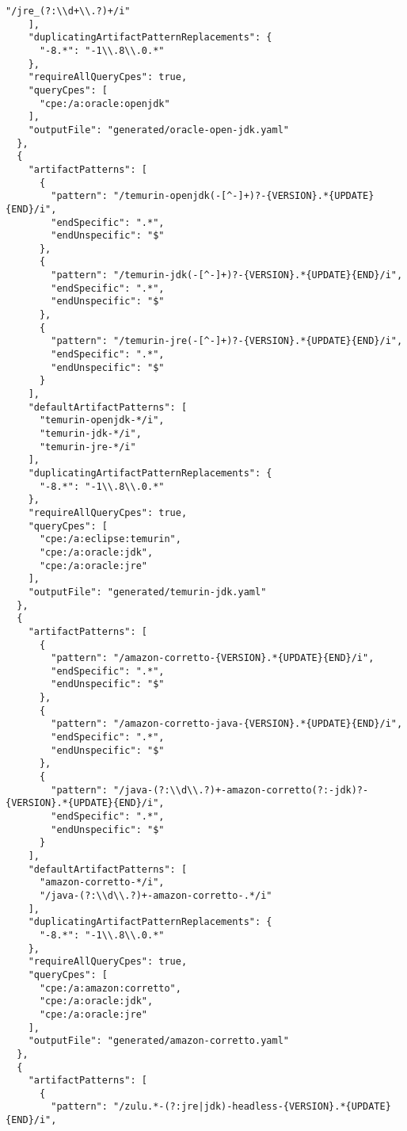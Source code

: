 \begin{lstlisting}[style=json,caption={Korrelationsgeneratordatei im Generatorformat für JRE/JDK},label={lst:correlation-generator-format-cpe-jre-jdk},basicstyle=\ttfamily\scriptsize]
      "/jre_(?:\\d+\\.?)+/i"
    ],
    "duplicatingArtifactPatternReplacements": {
      "-8.*": "-1\\.8\\.0.*"
    },
    "requireAllQueryCpes": true,
    "queryCpes": [
      "cpe:/a:oracle:openjdk"
    ],
    "outputFile": "generated/oracle-open-jdk.yaml"
  },
  {
    "artifactPatterns": [
      {
        "pattern": "/temurin-openjdk(-[^-]+)?-{VERSION}.*{UPDATE}{END}/i",
        "endSpecific": ".*",
        "endUnspecific": "$"
      },
      {
        "pattern": "/temurin-jdk(-[^-]+)?-{VERSION}.*{UPDATE}{END}/i",
        "endSpecific": ".*",
        "endUnspecific": "$"
      },
      {
        "pattern": "/temurin-jre(-[^-]+)?-{VERSION}.*{UPDATE}{END}/i",
        "endSpecific": ".*",
        "endUnspecific": "$"
      }
    ],
    "defaultArtifactPatterns": [
      "temurin-openjdk-*/i",
      "temurin-jdk-*/i",
      "temurin-jre-*/i"
    ],
    "duplicatingArtifactPatternReplacements": {
      "-8.*": "-1\\.8\\.0.*"
    },
    "requireAllQueryCpes": true,
    "queryCpes": [
      "cpe:/a:eclipse:temurin",
      "cpe:/a:oracle:jdk",
      "cpe:/a:oracle:jre"
    ],
    "outputFile": "generated/temurin-jdk.yaml"
  },
  {
    "artifactPatterns": [
      {
        "pattern": "/amazon-corretto-{VERSION}.*{UPDATE}{END}/i",
        "endSpecific": ".*",
        "endUnspecific": "$"
      },
      {
        "pattern": "/amazon-corretto-java-{VERSION}.*{UPDATE}{END}/i",
        "endSpecific": ".*",
        "endUnspecific": "$"
      },
      {
        "pattern": "/java-(?:\\d\\.?)+-amazon-corretto(?:-jdk)?-{VERSION}.*{UPDATE}{END}/i",
        "endSpecific": ".*",
        "endUnspecific": "$"
      }
    ],
    "defaultArtifactPatterns": [
      "amazon-corretto-*/i",
      "/java-(?:\\d\\.?)+-amazon-corretto-.*/i"
    ],
    "duplicatingArtifactPatternReplacements": {
      "-8.*": "-1\\.8\\.0.*"
    },
    "requireAllQueryCpes": true,
    "queryCpes": [
      "cpe:/a:amazon:corretto",
      "cpe:/a:oracle:jdk",
      "cpe:/a:oracle:jre"
    ],
    "outputFile": "generated/amazon-corretto.yaml"
  },
  {
    "artifactPatterns": [
      {
        "pattern": "/zulu.*-(?:jre|jdk)-headless-{VERSION}.*{UPDATE}{END}/i",

\end{lstlisting}
